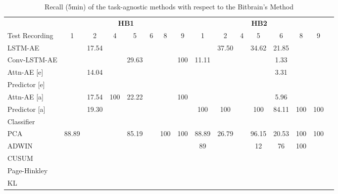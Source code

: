 \begin{table}[btp]
\centering
 \caption{Recall (5min) of the task-agnostic methods with respect to the Bitbrain's Method}
\label{tab5}

\begin{tabular}{lccccccccccccccc}
\toprule
          & \multicolumn{7}{c}{\textbf{HB1}} & \multicolumn{7}{c}{\textbf{HB2}} \\
\cmidrule(lr){2-8}\cmidrule(lr){9-15}
Test Recording & 1 & 2 & 4 & 5 & 6 & 8 & 9 & 1 & 2 & 4 & 5 & 6 & 8 & 9 \\
\cmidrule(lr){2-8}\cmidrule(lr){9-15}
LSTM-AE	&		&	17.54	&		&		&		&		&		&		&	37.50	&		&	34.62	&	21.85	&		&		\\
Conv-LSTM-AE	&		&		&		&	29.63	&		&		&	100	&	11.11	&		&		&		&	1.33	&		&		\\
\midrule
Attn-AE [e]	&		&	14.04	&		&		&		&		&		&		&		&		&		&	3.31	&		&		\\
Predictor [e]	&		&		&		&		&		&		&		&		&		&		&		&		&		&		\\
\midrule
Attn-AE [a]	&		&	17.54	&	100	&	22.22	&		&		&	100	&		&		&		&		&	5.96	&		&		\\
Predictor [a]	&		&	19.30	&		&		&		&		&		&	100	&	100	&		&	100	&	84.11	&	100	&	100	\\
Classifier  &&     &       &       &       &       &       &       &       &       &       &       &       &         \\
\midrule
PCA	&	88.89	&		&		&	85.19	&		&	100	&	100	&	88.89	&	26.79	&		&	96.15	&	20.53	&	100	&	100	\\
ADWIN      &   &     &       &     &       &     &       & 89 &   &       & 12  &  76 & 100  &         \\
CUSUM      &   &     &       &    &       &    &       &  &    &       &   &  &   &         \\
Page-Hinkley      &   &     &       &    &       &    &       &   &    &       &  &  &    &         \\
KL      &   &     &       &    &       &    &       &   &   &       &  &  &    &         \\
\bottomrule
\end{tabular}

\end{table}


